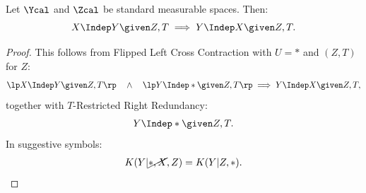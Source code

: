 \begin{Lem}
    Let $\Ycal$ and $\Zcal$ be standard measurable spaces. 
    Then:
    \[X \Indep  Y \given Z,T \implies Y \Indep X \given Z,T.\]
\begin{proof}
    This follows from Flipped Left Cross Contraction with $U=\ast$ and $(Z,T)$ for $Z$:
\[ \lp X \Indep Y \given Z,T \rp \quad \land\quad \lp Y \Indep \ast \given Z,T \rp \implies Y \Indep X \given Z,T, \]
together with $T$-Restricted Right Redundancy:
\[ Y \Indep \ast \given Z,T.  \]
In suggestive symbols:
\[ K(Y|\cancel{\ast,X},Z) = K(Y|Z,\ast).\]
\end{proof}
\end{Lem}
